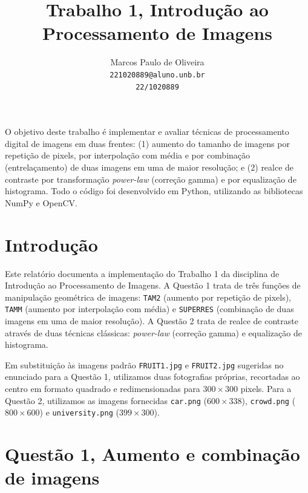 \documentclass[10pt,twocolumn,letterpaper]{article}
\begin{document}
\title{Trabalho 1, Introdução ao Processamento de Imagens}

\author{Marcos Paulo de Oliveira\\
{\tt\small 221020889@aluno.unb.br}\\
{\tt\small 22/1020889}
}

\maketitle

\begin{objetivo}
O objetivo deste trabalho é implementar e avaliar técnicas de processamento
digital de imagens em duas frentes: (1) aumento do tamanho de imagens por
repetição de pixels, por interpolação com média e por combinação
(entrelaçamento) de duas imagens em uma de maior resolução; e (2) realce de
contraste por transformação \emph{power-law} (correção gamma) e por
equalização de histograma. Todo o código foi desenvolvido em Python,
utilizando as bibliotecas NumPy e OpenCV.
\end{objetivo}

\section{Introdução}

Este relatório documenta a implementação do Trabalho 1 da disciplina de
Introdução ao Processamento de Imagens. A Questão 1 trata de três funções de
manipulação geométrica de imagens: \texttt{TAM2} (aumento por repetição de
pixels), \texttt{TAMM} (aumento por interpolação com média) e
\texttt{SUPERRES} (combinação de duas imagens em uma de maior resolução). A
Questão 2 trata de realce de contraste através de duas técnicas clássicas:
\emph{power-law} (correção gamma) e equalização de histograma.

Em substituição às imagens padrão \texttt{FRUIT1.jpg} e \texttt{FRUIT2.jpg}
sugeridas no enunciado para a Questão 1, utilizamos duas fotografias
próprias, recortadas ao centro em formato quadrado e redimensionadas para
$300\times300$ pixels. Para a Questão 2, utilizamos as imagens fornecidas
\texttt{car.png} ($600\times338$), \texttt{crowd.png} ($800\times600$) e
\texttt{university.png} ($399\times300$).

\section{Questão 1, Aumento e combinação de imagens}
\end{document}
